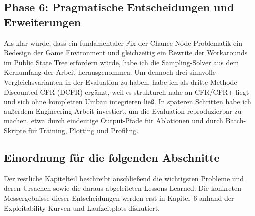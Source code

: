 \subsection{Phase 6: Pragmatische Entscheidungen und Erweiterungen}
Als klar wurde, dass ein fundamentaler Fix der Chance-Node-Problematik ein Redesign der Game Environment und gleichzeitig ein Rewrite der Workarounds im Public State Tree erfordern würde, habe ich die Sampling-Solver aus dem Kernumfang der Arbeit herausgenommen.
Um dennoch drei sinnvolle Vergleichsvarianten in der Evaluation zu haben, habe ich als dritte Methode Discounted CFR (DCFR) ergänzt, weil es strukturell nahe an CFR/CFR+ liegt und sich ohne kompletten Umbau integrieren ließ.
In späteren Schritten habe ich außerdem Engineering-Arbeit investiert, um die Evaluation reproduzierbar zu machen, etwa durch eindeutige Output-Pfade für Ablationen und durch Batch-Skripte für Training, Plotting und Profiling.

\subsection{Einordnung für die folgenden Abschnitte}
Der restliche Kapitelteil beschreibt anschließend die wichtigsten Probleme und deren Ursachen sowie die daraus abgeleiteten Lessons Learned.
Die konkreten Messergebnisse dieser Entscheidungen werden erst in Kapitel~6 anhand der Exploitability-Kurven und Laufzeitplots diskutiert.

